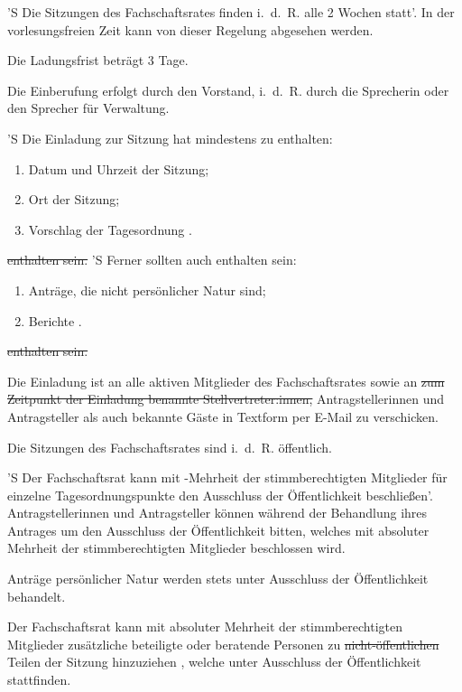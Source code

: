\documentclass[%
	parskip=half,
]{scrartcl}
\newcounter{enumitem}
\newcommand{\edit}[1]{{\color{red} #1}}
\newcommand{\add}[1]{{\color{blue} #1}}
\newcommand{\new}[1]{{\color{orange} #1}}
\newcommand{\delete}[1]{{\color{red} \sout{#1}}}
\begin{document}
\begin{contract}


'S Die Sitzungen des Fachschaftsrates finden i.~d.~R. alle 2 Wochen statt'. In der vorlesungsfreien Zeit kann von 
dieser Regelung abgesehen werden.

Die Ladungsfrist beträgt 3 Tage.\label{ladungsfrist}

Die Einberufung erfolgt durch den Vorstand, i.~d.~R. durch \edit{die Sprecherin oder den Sprecher} für Verwaltung.

'S Die Einladung zur Sitzung hat mindestens \add{zu enthalten}:
\begin{enumerate}[\qquad a)]
	\item Datum und \edit{Uhrzeit} der Sitzung;
	\item Ort der Sitzung;
	\item Vorschlag der Tagesordnung\edit{.}
	\setcounter{enumitem}{\value{enumi}}
\end{enumerate}
\delete{enthalten sein.}
'S Ferner sollten auch \add{enthalten sein}:
\begin{enumerate}[\qquad a)]
	\setcounter{enumi}{\value{enumitem}}
	\item Anträge, die nicht persönlicher Natur sind;
	\item Berichte\edit{.}
\end{enumerate}
\delete{enthalten sein.}

Die Einladung ist an alle \new{aktiven} Mitglieder des Fachschaftsrates sowie an \delete{zum Zeitpunkt der Einladung
benannte Stellvertreter:innen,} \edit{Antragstellerinnen und Antragsteller als auch} bekannte Gäste in Textform per
E-Mail zu verschicken.


Die Sitzungen des Fachschaftsrates sind i.~d.~R. öffentlich.

'S Der Fachschaftsrat kann mit -Mehrheit der stimmberechtigten Mitglieder für einzelne 
Tagesordnungspunkte den Ausschluss der Öffentlichkeit beschließen'. \edit{Antragstellerinnen und Antragsteller können 
während der Behandlung ihres Antrages um den Ausschluss der Öffentlichkeit bitten, welches mit absoluter Mehrheit der 
stimmberechtigten Mitglieder beschlossen wird.}

Anträge persönlicher Natur werden stets \edit{unter Ausschluss der Öffentlichkeit} behandelt.

Der Fachschaftsrat kann mit absoluter Mehrheit der stimmberechtigten Mitglieder zusätzliche beteiligte oder beratende 
Personen zu \delete{nicht-öffentlichen} Teilen der Sitzung hinzuziehen\add{, welche unter Ausschluss der Öffentlichkeit 
stattfinden}.


\end{contract}
\end{document}
